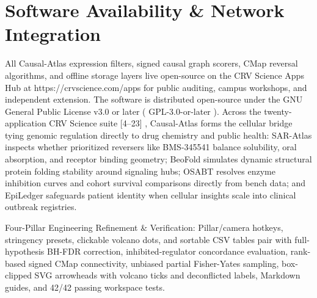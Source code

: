 \documentclass[10pt,letterpaper]{article}
\begin{document}
\section{Software Availability \& Network Integration}
All Causal-Atlas expression filters, signed causal graph scorers, CMap reversal algorithms, and offline storage layers live open-source on the CRV Science Apps Hub at https://crvscience.com/apps for public auditing, campus workshops, and independent extension. The software is distributed open-source under the GNU General Public License v3.0 or later ( GPL-3.0-or-later ). Across the twenty-application CRV Science suite [4--23] , Causal-Atlas forms the cellular bridge tying genomic regulation directly to drug chemistry and public health: SAR-Atlas inspects whether prioritized reversers like BMS-345541 balance solubility, oral absorption, and receptor binding geometry; BeoFold simulates dynamic structural protein folding stability around signaling hubs; OSABT resolves enzyme inhibition curves and cohort survival comparisons directly from bench data; and EpiLedger safeguards patient identity when cellular insights scale into clinical outbreak registries.

Four-Pillar Engineering Refinement \& Verification: Pillar/camera hotkeys, stringency presets, clickable volcano dots, and sortable CSV tables pair with full-hypothesis BH-FDR correction, inhibited-regulator concordance evaluation, rank-based signed CMap connectivity, unbiased partial Fisher-Yates sampling, box-clipped SVG arrowheads with volcano ticks and deconflicted labels, Markdown guides, and 42/42 passing workspace tests.
\end{document}
